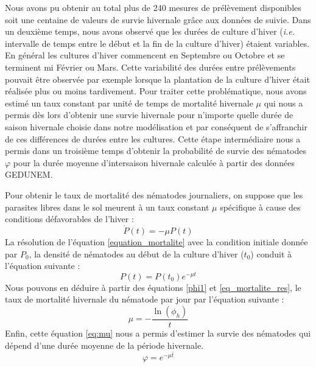	
	\noindent Nous avons pu obtenir  au total plus de 240 mesures de prélèvement disponibles soit une centaine de valeurs de survie hivernale grâce aux données de suivie. 
Dans un deuxième temps, nous avons observé que les durées de culture d'hiver (\textit{i.e.} intervalle de temps entre le début et la fin de la culture d'hiver)  étaient variables. 
En général les cultures d'hiver commencent en Septembre ou Octobre et se terminent  mi Février ou Mars.  Cette variabilité des durées entre prélèvements pouvait être observée par exemple lorsque  la plantation de la culture d'hiver était réalisée plus ou moins tardivement. Pour traiter cette problématique, nous avons  estimé un taux constant par unité de temps de mortalité hivernale $\mu$ qui nous a permis dès lors d'obtenir une survie hivernale pour n'importe quelle durée de saison hivernale choisie dans notre modélisation et par conséquent de s’affranchir de ces différences de durées entre les cultures. Cette étape intermédiaire nous a permis dans un troisième temps d'obtenir la probabilité de survie des nématodes $\varphi$ pour la durée moyenne d'intersaison hivernale calculée à partir des données \gls{GEDUNEM}. 
	
	Pour obtenir le taux de mortalité  des nématodes journaliers, on suppose que les parasites libres dans le sol meurent à un taux constant $\mu$ spécifique à cause des conditions défavorables de l'hiver :
	  \begin{equation} \label{equation_mortalite}
	    \dot{P}(t) = -\mu P(t) 
	\end{equation}
La résolution de l'équation \eqref{equation_mortalite} avec la condition initiale donnée par $P_0$, la densité de nématodes au début de la culture d'hiver ($t_0$)   conduit à l’équation suivante : 
	\begin{equation}  \label{eq_mortalite_res} 
	    P(t) =  P(t_0) e^{-\mu t} 
	\end{equation} 
Nous pouvons en déduire à partir des équations \eqref{phi1} et \eqref{eq_mortalite_res}, le taux de mortalité hivernale du nématode par jour par l'équation suivante : 
	\begin{equation}
	\mu=-\dfrac{\ln(\phi_h)}{t}
	\label{eq:mu}
	\end{equation}
Enfin, cette équation \eqref{eq:mu}  nous a permis d'estimer la survie des nématodes qui dépend d'une durée moyenne de la période hivernale. 
	\begin{equation}
	\varphi= e^{-\mu \bar{t}}
	\label{survie_inter}
	\end{equation}
	
